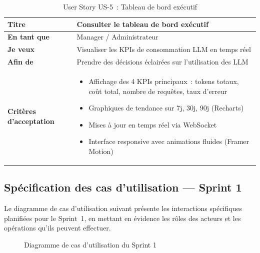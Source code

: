 \begin{table}[H]
\centering
\caption{User Story US-5~: Tableau de bord exécutif}
\label{tab:us5}
\begin{tabularx}{\textwidth}{|l|X|}
\hline
\textbf{Titre} & Consulter le tableau de bord exécutif \\
\hline
\textbf{En tant que} & Manager / Administrateur \\
\hline
\textbf{Je veux} & Visualiser les KPIs de consommation LLM en temps réel \\
\hline
\textbf{Afin de} & Prendre des décisions éclairées sur l'utilisation des LLM \\
\hline
\textbf{Critères d'acceptation} & \begin{minipage}[t]{\linewidth}\vspace{2pt}
\begin{itemize}[noitemsep,topsep=0pt]
\item Affichage des 4 KPIs principaux~: tokens totaux, coût total, nombre de requêtes, taux d'erreur
\item Graphiques de tendance sur 7j, 30j, 90j (Recharts)
\item Mises à jour en temps réel via WebSocket
\item Interface responsive avec animations fluides (Framer Motion)
\end{itemize}\vspace{2pt}
\end{minipage} \\
\hline
\end{tabularx}
\end{table}


\subsection{Spécification des cas d'utilisation --- Sprint 1}

Le diagramme de cas d'utilisation suivant présente les interactions spécifiques planifiées pour le Sprint~1, en mettant en évidence les rôles des acteurs et les opérations qu'ils peuvent effectuer.

\begin{figure}[H]
    \centering
    \caption{Diagramme de cas d'utilisation du Sprint 1}
    \label{fig:uc_sprint1}
\end{figure}


